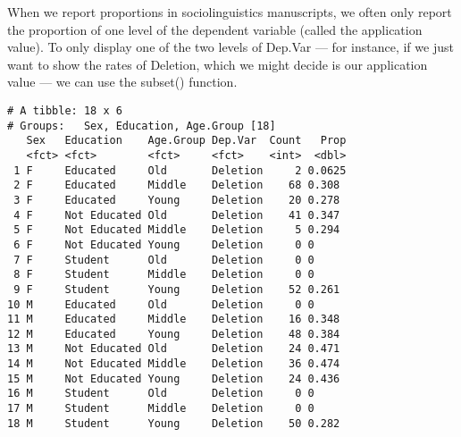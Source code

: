 \documentclass[
  12pt,
  letterpaper]{article}
\newenvironment{Shaded}{\begin{snugshade}}{\end{snugshade}}
\newcommand{\AttributeTok}[1]{\textcolor[rgb]{0.40,0.45,0.13}{#1}}
\newcommand{\CommentTok}[1]{\textcolor[rgb]{0.37,0.37,0.37}{#1}}
\newcommand{\ConstantTok}[1]{\textcolor[rgb]{0.56,0.35,0.01}{#1}}
\newcommand{\DecValTok}[1]{\textcolor[rgb]{0.68,0.00,0.00}{#1}}
\newcommand{\FunctionTok}[1]{\textcolor[rgb]{0.28,0.35,0.67}{#1}}
\newcommand{\NormalTok}[1]{\textcolor[rgb]{0.00,0.23,0.31}{#1}}
\newcommand{\OtherTok}[1]{\textcolor[rgb]{0.00,0.23,0.31}{#1}}
\newcommand{\SpecialCharTok}[1]{\textcolor[rgb]{0.37,0.37,0.37}{#1}}
\newcommand{\StringTok}[1]{\textcolor[rgb]{0.13,0.47,0.30}{#1}}
\renewcommand\texttt[1]{{\ttfamily\color{BrickRed}#1}}
\begin{document}
When we report proportions in sociolinguistics manuscripts, we often
only report the proportion of one level of the dependent variable
(called the application value). To only display one of the two levels of
\texttt{Dep.Var} --- for instance, if we just want to show the rates of
\texttt{Deletion}, which we might decide is our application value --- we
can use the \texttt{subset()} function.

\begin{Shaded}
\end{Shaded}

\begin{verbatim}
# A tibble: 18 x 6
# Groups:   Sex, Education, Age.Group [18]
   Sex   Education    Age.Group Dep.Var  Count   Prop
   <fct> <fct>        <fct>     <fct>    <int>  <dbl>
 1 F     Educated     Old       Deletion     2 0.0625
 2 F     Educated     Middle    Deletion    68 0.308 
 3 F     Educated     Young     Deletion    20 0.278 
 4 F     Not Educated Old       Deletion    41 0.347 
 5 F     Not Educated Middle    Deletion     5 0.294 
 6 F     Not Educated Young     Deletion     0 0     
 7 F     Student      Old       Deletion     0 0     
 8 F     Student      Middle    Deletion     0 0     
 9 F     Student      Young     Deletion    52 0.261 
10 M     Educated     Old       Deletion     0 0     
11 M     Educated     Middle    Deletion    16 0.348 
12 M     Educated     Young     Deletion    48 0.384 
13 M     Not Educated Old       Deletion    24 0.471 
14 M     Not Educated Middle    Deletion    36 0.474 
15 M     Not Educated Young     Deletion    24 0.436 
16 M     Student      Old       Deletion     0 0     
17 M     Student      Middle    Deletion     0 0     
18 M     Student      Young     Deletion    50 0.282 
\end{verbatim}
\end{document}
